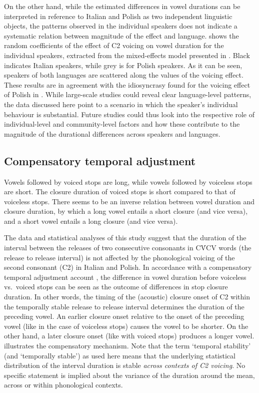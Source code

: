 \documentclass[charis]{glossa}
\begin{document}
On the other hand, while the estimated differences in vowel durations
can be interpreted in reference to Italian and Polish as two independent
linguistic objects, the patterns observed in the individual speakers
does not indicate a systematic relation between magnitude of the effect
and language.  shows the random coefficients of the
effect of C2 voicing on vowel duration for the individual speakers,
extracted from the mixed-effects model presented in .
Black indicates Italian speakers, while grey is for Polish speakers. As
it can be seen, speakers of both languages are scattered along the
values of the voicing effect. These results are in agreement with the
idiosyncrasy found for the voicing effect of Polish in
\citet{malisz2008}. While large-scale studies could reveal clear
language-level patterns, the data discussed here point to a scenario in
which the speaker's individual behaviour is substantial. Future studies
could thus look into the respective role of individual-level and
community-level factors and how these contribute to the magnitude of the
durational differences across speakers and languages.

\hypertarget{compensatory-temporal-adjustment}{%
\subsection{Compensatory temporal
adjustment}\label{compensatory-temporal-adjustment}}

\label{s:comp}

Vowels followed by voiced stops are long, while vowels followed by
voiceless stops are short. The closure duration of voiced stops is short
compared to that of voiceless stops. There seems to be an inverse
relation between vowel duration and closure duration, by which a long
vowel entails a short closure (and vice versa), and a short vowel
entails a long closure (and vice versa).

The data and statistical analyses of this study suggest that the
duration of the interval between the releases of two consecutive
consonants in CV́CV words (the release to release interval) is not
affected by the phonological voicing of the second consonant (C2) in
Italian and Polish. In accordance with a compensatory temporal
adjustment account \citep{slis1969, lehiste1970}, the difference in
vowel duration before voiceless vs.~voiced stops can be seen as the
outcome of differences in stop closure duration. In other words, the
timing of the (acoustic) closure onset of C2 within the temporally
stable release to release interval determines the duration of the
preceding vowel. An earlier closure onset relative to the onset of the
preceding vowel (like in the case of voiceless stops) causes the vowel
to be shorter. On the other hand, a later closure onset (like with
voiced stops) produces a longer vowel.  illustrates
the compensatory mechanism. Note that the term `temporal stability' (and
`temporally stable') as used here means that the underlying statistical
distribution of the interval duration is stable \emph{across contexts of
C2 voicing}. No specific statement is implied about the variance of the
duration around the mean, across or within phonological contexts.
\end{document}
